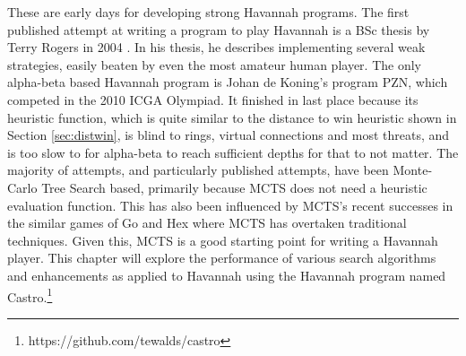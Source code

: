 


These are early days for developing strong Havannah programs. The first published attempt at writing a program to play Havannah is a BSc thesis by Terry Rogers in 2004 \cite{rogers2004bsc}. In his thesis, he describes implementing several weak strategies, easily beaten by even the most amateur human player. The only alpha-beta based Havannah program is Johan de Koning's program PZN, which competed in the 2010 ICGA Olympiad. It finished in last place because its heuristic function, which is quite similar to the distance to win heuristic shown in Section \ref{sec:distwin}, is blind to rings, virtual connections and most threats, and is too slow to for alpha-beta to reach sufficient depths for that to not matter. The majority of attempts, and particularly published attempts, have been Monte-Carlo Tree Search based, primarily because MCTS does not need a heuristic evaluation function. This has also been influenced by MCTS's recent successes in the similar games of Go and Hex where MCTS has overtaken traditional techniques. Given this, MCTS is a good starting point for writing a Havannah player. This chapter will explore the performance of various search algorithms and enhancements as applied to Havannah using the Havannah program named Castro.\footnote{https://github.com/tewalds/castro}

